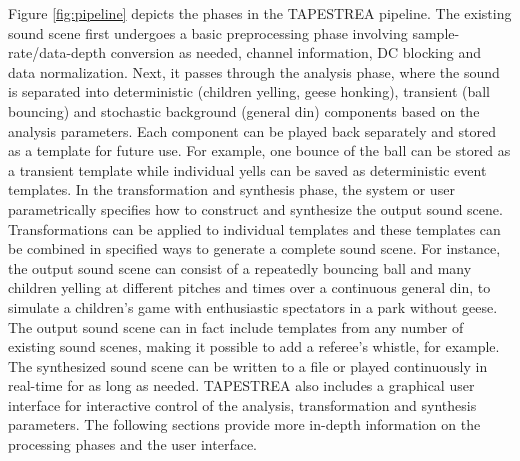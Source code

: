 \documentclass{acmsiggraph}               %
\begin{document}
Figure \ref{fig:pipeline} depicts the phases in the TAPESTREA pipeline. The existing sound scene first
undergoes a basic preprocessing phase involving sample-rate/data-depth 
conversion as needed, channel information, DC blocking and data normalization. Next, it passes through the 
analysis phase, where the sound is separated into deterministic (children yelling, geese honking), 
transient (ball bouncing) and stochastic background (general din) 
components based on the analysis parameters. Each component can be played back separately 
and stored as a template for future use. For example, one bounce of the ball can 
be stored as a transient template while individual yells can be saved as deterministic event 
templates. In the transformation and synthesis phase, the system or user parametrically specifies how to construct and synthesize the output sound scene. Transformations can be applied to individual 
templates and these templates can be combined in specified ways to generate a complete sound scene. 
For instance, the output sound scene can consist of a repeatedly bouncing ball and many children yelling 
at different pitches and times over a continuous general din, to simulate a 
children's game with enthusiastic spectators in a park without geese. The output sound scene can in fact   
include templates from any number of existing sound scenes, making it possible to add a referee's whistle, 
for example. The synthesized sound scene can be written to a file or played continuously in real-time 
for as long as needed. TAPESTREA also includes a graphical user interface for interactive control 
of the analysis, transformation and synthesis parameters. The following sections provide more in-depth 
information on the processing phases and the user interface. 

\end{document}
